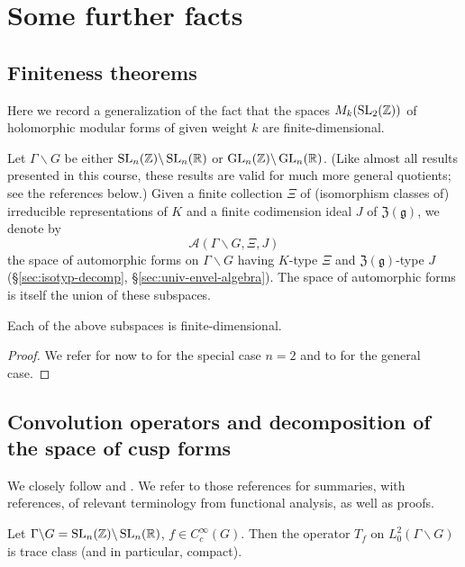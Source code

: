 \documentclass[reqno]{amsart} 
\begin{document}
\section{Some further facts}

\subsection{Finiteness theorems}
Here we record a generalization of the fact that the spaces $M_k(\operatorname{SL}_2(\mathbb{Z}))$ of holomorphic modular forms of given weight $k$ are finite-dimensional.

Let $\Gamma \backslash G$ be either $\operatorname{SL}_n(\mathbb{Z}) \backslash \operatorname{SL}_n (\mathbb{R})$ or $\operatorname{GL}_n (\mathbb{Z}) \backslash \operatorname{GL}_n (\mathbb{R})$.  (Like almost all results presented in this course, these results are valid for much more general quotients; see the references below.)  Given a finite collection $\Xi$ of (isomorphism classes of) irreducible representations of $K$ and a finite codimension ideal $J$ of $\mathfrak{Z}(\mathfrak{g})$, we denote by
\begin{equation*}
  \mathcal{A} (\Gamma \backslash G, \Xi, J)
\end{equation*}
the space of automorphic forms on $\Gamma \backslash G$ having $K$-type $\Xi$ and $\mathfrak{Z}(\mathfrak{g})$-type $J$ (\S\ref{sec:isotyp-decomp}, \S\ref{sec:univ-envel-algebra}).  The space of automorphic forms is itself the union of these subspaces.
\begin{theorem}
  Each of the above subspaces is finite-dimensional.
\end{theorem}
\begin{proof}
  We refer for now to \cite[\S8]{MR1482800} for the special case $n=2$ and to \cite[Thm 7.4]{MR2331343} for the general case.
\end{proof}

\subsection{Convolution operators and decomposition of the space of cusp forms}

We closely follow \cite[\S9]{MR1482800} and \cite[\S8]{MR2331343}.  We refer to those references for summaries, with references, of relevant terminology from functional analysis, as well as proofs.

\begin{theorem}
  Let $\Gamma \backslash G = \operatorname{SL}_n(\mathbb{Z}) \backslash \operatorname{SL}_n(\mathbb{R})$, $f \in C_c^\infty(G)$.  Then the operator $T_f$ on $L^2_0(\Gamma \backslash G)$ is trace class (and in particular, compact).
\end{theorem}
\end{document}
